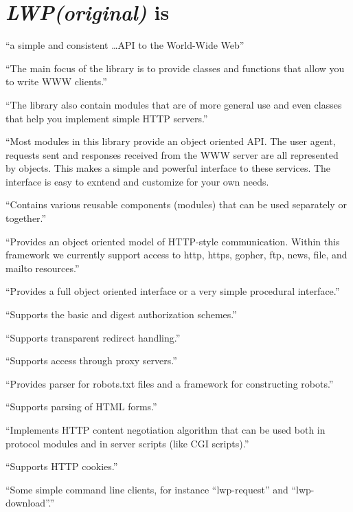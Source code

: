 \documentclass{article}
\newcommand{\LWP}{\emph{LWP(original)}}
\begin{document}
\part*{\LWP{} is}
    ``a simple and consistent \ldots API to the World-Wide Web''

    ``The main focus of the library is to provide classes and functions that
    allow you to write WWW clients.''

    ``The library also contain modules that are of more general use and even
    classes that help you implement simple HTTP servers.''

    ``Most modules in this library provide an object oriented API. The user
    agent, requests sent and responses received from the WWW server are all
    represented by objects. This makes a simple and powerful interface to these
    services. The interface is easy to exntend and customize for your own needs.

    ``Contains various reusable components (modules) that can be used separately
    or together.''

    ``Provides an object oriented model of HTTP-style communication. Within this
    framework we currently support access to http, https, gopher, ftp, news,
    file, and mailto resources.''

    ``Provides a full object oriented interface or a very simple procedural
    interface.''

    ``Supports the basic and digest authorization schemes.''

    ``Supports transparent redirect handling.''

    ``Supports access through proxy servers.''

    ``Provides parser for robots.txt files and a framework for constructing
    robots.''

    ``Supports parsing of HTML forms.''

    ``Implements HTTP content negotiation algorithm that can be used both in
    protocol modules and in server scripts (like CGI scripts).''

    ``Supports HTTP cookies.''

    ``Some simple command line clients, for instance ``lwp-request'' and
    ``lwp-download''.''
\end{document}
